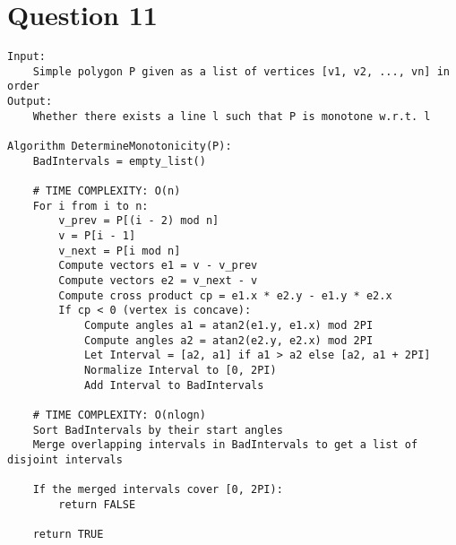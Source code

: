 \documentclass{article}
\begin{document}
\section*{Question 11}
\begin{verbatim}
Input: 
    Simple polygon P given as a list of vertices [v1, v2, ..., vn] in order
Output: 
    Whether there exists a line l such that P is monotone w.r.t. l

Algorithm DetermineMonotonicity(P):
    BadIntervals = empty_list()

    # TIME COMPLEXITY: O(n)
    For i from i to n:
        v_prev = P[(i - 2) mod n]   
        v = P[i - 1]
        v_next = P[i mod n]
        Compute vectors e1 = v - v_prev
        Compute vectors e2 = v_next - v
        Compute cross product cp = e1.x * e2.y - e1.y * e2.x
        If cp < 0 (vertex is concave):
            Compute angles a1 = atan2(e1.y, e1.x) mod 2PI
            Compute angles a2 = atan2(e2.y, e2.x) mod 2PI
            Let Interval = [a2, a1] if a1 > a2 else [a2, a1 + 2PI]
            Normalize Interval to [0, 2PI)
            Add Interval to BadIntervals

    # TIME COMPLEXITY: O(nlogn)
    Sort BadIntervals by their start angles
    Merge overlapping intervals in BadIntervals to get a list of disjoint intervals

    If the merged intervals cover [0, 2PI): 
        return FALSE

    return TRUE
\end{verbatim}

\newpage
\end{document}
